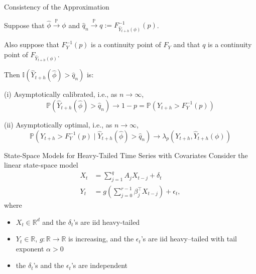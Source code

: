 \documentclass{beamer}
\def\I{\mathbb I}
\def\P{\mathbb P}
\def\R{\mathbb R}
\newcommand{\AROptPred}[3]{\hat{Y}_{#1 + #2}(#3)}
\newcommand{\approxAROptPred}[3]{\hat{Y}_{#1 + #2}(\hat{#3})}
\begin{document}
\begin{frame}{Consistency of the Approximation}
    \begin{theorem}
        Suppose that $\hat{\phi} \xrightarrow{\P} \phi$ and $\hat{q}_n \xrightarrow{\P} q := F_{\AROptPred{t}{h}{\phi}}^{-1}(p)$.
        
        Also suppose that $F_Y^{-1}(p)$ is a continuity point of $F_Y$ and that $q$ is a continuity point of $F_{\AROptPred{t}{h}{\phi}}$.
        
        Then $\I(\approxAROptPred{t}{h}{\phi} > \hat{q}_n)$ is:
        
        (i) Asymptotically calibrated, i.e., as $n \to \infty$,
        \[
        \P(\approxAROptPred{t}{h}{\phi} > \hat{q}_n) \to 1 - p = \P(Y_{t + h} > F_Y^{-1}(p))
        \]
        
        (ii) Asymptotically optimal, i.e., as $n \to \infty$,
        \[
        \P(Y_{t+h} > F_Y^{-1}(p) \mid \approxAROptPred{t}{h}{\phi} > \hat{q}_n) \to \lambda_p(Y_{t + h}, \AROptPred{t}{h}{\phi})
        \]
    \end{theorem}
\end{frame}

\begin{frame}{State-Space Models for Heavy-Tailed Time Series with Covariates}
    Consider the linear state-space model
    \begin{equation}\label{eq:orig_ssm}
        \begin{split}
            X_t &= \sum_{j = 1}^q A_j X_{t - j} + \delta_t \\
            Y_t &= g \left( \sum_{j = 0}^{r - 1} \beta_j^{\top} X_{t - j} \right) + \epsilon_t,
        \end{split}
    \end{equation}
    where
    \begin{itemize}
        \item $X_t \in \R^d$ and the $\delta_t$'s are iid heavy-tailed
        \item $Y_t \in \R$, $g :\R \to \R$ is increasing, and the $\epsilon_t$'s are iid heavy--tailed with tail exponent $\alpha > 0$
        \item the $\delta_t$'s and the $\epsilon_t$'s are independent
    \end{itemize}
\end{frame}
\end{document}
